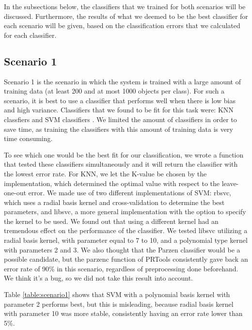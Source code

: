 \documentclass[11pt,twoside,a4paper]{article}
\begin{document}
In the subsections below, the classifiers that we trained for both scenarios will be discussed. Furthermore, the results of what we deemed to be the best classifier for each scenario will be given, based on the classification errors that we calculated for each classifier.
\subsection{Scenario 1}
Scenario 1 is the scenario in which the system is trained with a large amount of training data (at least 200 and at most 1000 objects per class). For such a scenario, it is best to use a classifier that performs well when there is low bias and high variance. Classifiers that we found to be fit for this task were: KNN classfiers and SVM classifiers \cite{liu2003handwritten}. We limited the amount of classifiers in order to save time, as training the classifiers with this amount of training data is very time consuming.

To see which one would be the best fit for our classification, we wrote a function that tested these classifiers simultaneously and it will return the classifier with the lowest error rate. For KNN, we let the K-value be chosen by the implementation, which determined the optimal value with respect to the leave-one-out error. We made use of two different implementations of SVM: rbsvc, which uses a radial basis kernel and cross-validation to determine the best parameters, and libsvc, a more general implementation with the option to specify the kernel to be used. We found out that using a different kernel had an tremendous effect on the performance of the classifier. We tested libsvc utilizing a radial basis kernel, with parameter equal to 7 to 10, and a polynomial type kernel with parameters 2 and 3. We also thought that the Parzen classifier would be a possible candidate, but the parzenc function of PRTools consistently gave back an error rate of 90\% in this scenario, regardless of preprocessing done beforehand. We think it's a bug, so we did not take this result into account.

Table \ref{table:scenario1} shows that SVM with a polynomial basis kernel with parameter 2 performs best, but this is misleading, because radial basis kernel with parameter 10 was more stable, consistently having an error rate lower than 5\%.
\end{document}
